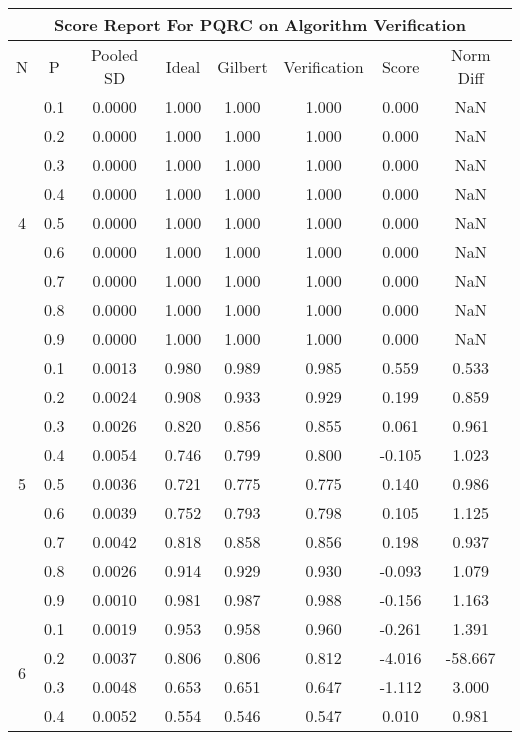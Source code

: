 \documentclass[11pt,a4paper]{report}
\begin{document}
\begin{longtable}{ | c | c || c | c | c | c | c | c | }
\hline
\multicolumn{8}{|c|}{ Score Report For PQRC on Algorithm Verification} \\
\hline
N & P & Pooled SD &  Ideal &  Gilbert & Verification  & Score & Norm Diff \\
 \hline
 \hline
 \endhead
\multirow{9}{*}{4} & 0.1 & 0.0000 & 1.000 & 1.000 & 1.000 & 0.000 & NaN \\
 & 0.2 & 0.0000 & 1.000 & 1.000 & 1.000 & 0.000 & NaN \\
 & 0.3 & 0.0000 & 1.000 & 1.000 & 1.000 & 0.000 & NaN \\
 & 0.4 & 0.0000 & 1.000 & 1.000 & 1.000 & 0.000 & NaN \\
 & 0.5 & 0.0000 & 1.000 & 1.000 & 1.000 & 0.000 & NaN \\
 & 0.6 & 0.0000 & 1.000 & 1.000 & 1.000 & 0.000 & NaN \\
 & 0.7 & 0.0000 & 1.000 & 1.000 & 1.000 & 0.000 & NaN \\
 & 0.8 & 0.0000 & 1.000 & 1.000 & 1.000 & 0.000 & NaN \\
 & 0.9 & 0.0000 & 1.000 & 1.000 & 1.000 & 0.000 & NaN \\
 \hline
\multirow{9}{*}{5} & 0.1 & 0.0013 & 0.980 & 0.989 & 0.985 & 0.559 & 0.533 \\
 & 0.2 & 0.0024 & 0.908 & 0.933 & 0.929 & 0.199 & 0.859 \\
 & 0.3 & 0.0026 & 0.820 & 0.856 & 0.855 & 0.061 & 0.961 \\
 & 0.4 & 0.0054 & 0.746 & 0.799 & 0.800 & -0.105 & 1.023 \\
 & 0.5 & 0.0036 & 0.721 & 0.775 & 0.775 & 0.140 & 0.986 \\
 & 0.6 & 0.0039 & 0.752 & 0.793 & 0.798 & 0.105 & 1.125 \\
 & 0.7 & 0.0042 & 0.818 & 0.858 & 0.856 & 0.198 & 0.937 \\
 & 0.8 & 0.0026 & 0.914 & 0.929 & 0.930 & -0.093 & 1.079 \\
 & 0.9 & 0.0010 & 0.981 & 0.987 & 0.988 & -0.156 & 1.163 \\
 \hline
\multirow{9}{*}{6} & 0.1 & 0.0019 & 0.953 & 0.958 & 0.960 & -0.261 & 1.391 \\
 & 0.2 & 0.0037 & 0.806 & 0.806 & 0.812 & -4.016 & -58.667 \\
 & 0.3 & 0.0048 & 0.653 & 0.651 & 0.647 & -1.112 & 3.000 \\
 & 0.4 & 0.0052 & 0.554 & 0.546 & 0.547 & 0.010 & 0.981 \\

\end{longtable}
\end{document}
